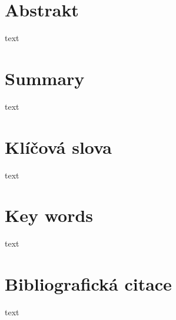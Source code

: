 \documentclass[12pt,twoside,a4paper]{report}
\newcommand\blankpage{
    \null
    \thispagestyle{empty}
    \newpage
}
\begin{document}
\afterpage{\blankpage}

\pagestyle{empty}
%
%

\section*{Abstrakt}
text
\section*{Summary}
text

\hbox{}
\vfill

\section*{Klíčová slova}
text
\section*{Key words}
text
\vskip1cm

\newpage
\hbox{}
\vfill

\section*{Bibliografická citace}
text
\vskip1cm
\end{document}
